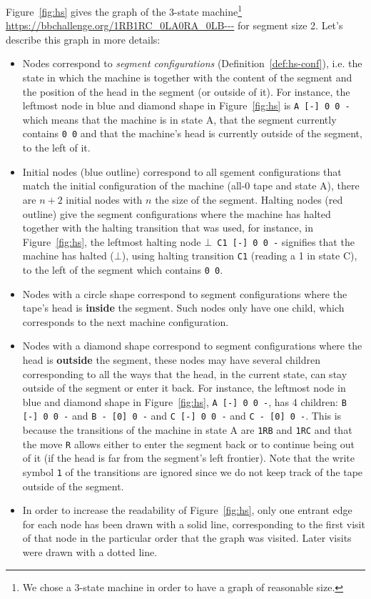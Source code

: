 Figure~\ref{fig:hs} gives the \HS graph of the 3-state machine\footnote{We chose a 3-state machine in order to have a graph of reasonable size.} \url{https://bbchallenge.org/1RB1RC_0LA0RA_0LB---} for segment size 2. Let's describe this graph in more details:

\begin{itemize}
  \item Nodes correspond to \textit{segment configurations} (Definition~\ref{def:hs-conf}), i.e. the state in which the machine is together with the content of the segment and the position of the head in the segment (or outside of it). For instance, the leftmost node in blue and diamond shape in Figure~\ref{fig:hs} is \texttt{A [-] 0 0 -} which means that the machine is in state A, that the segment currently contains \texttt{0 0} and that the machine's head is currently outside of the segment, to the left of it.

  \item Initial nodes (blue outline) correspond to all sgement configurations that match the initial configuration of the machine (all-0 tape and state A), there are $n+2$ initial nodes with $n$ the size of the segment. Halting nodes (red outline) give the segment configurations where the machine has halted together with the halting transition that was used, for instance, in Figure~\ref{fig:hs}, the leftmost halting node \texttt{$\bot$ C1 [-] 0 0 -} signifies that the machine has halted ($\bot$), using halting transition \texttt{C1} (reading a 1 in state C), to the left of the segment which contains \texttt{0 0}.

  \item Nodes with a circle shape correspond to segment configurations where the tape's head is \textbf{inside} the segment. Such nodes only have one child, which corresponds to the next machine configuration.

  \item Nodes with a diamond shape correspond to segment configurations where the head is \textbf{outside} the segment, these nodes may have several children corresponding to all the ways that the head, in the current state, can stay outside of the segment or enter it back. For instance, the leftmost node in blue and diamond shape in Figure~\ref{fig:hs}, \texttt{A [-] 0 0 -}, has 4 children: \texttt{B [-] 0 0 -} and \texttt{B - [0] 0 -} and \texttt{C [-] 0 0 -} and \texttt{C - [0] 0 -}. This is because the transitions of the machine in state A are \texttt{1RB} and \texttt{1RC} and that the move \texttt{R} allows either to enter the segment back or to continue being out of it (if the head is far from the segment's left frontier). Note that the write symbol \texttt{1} of the transitions are ignored since we do not keep track of the tape outside of the segment.

  \item In order to increase the readability of Figure~\ref{fig:hs}, only one entrant edge for each node has been drawn with a solid line, corresponding to the first visit of that node in the particular order that the graph was visited. Later visits were drawn with a dotted line.
\end{itemize}

